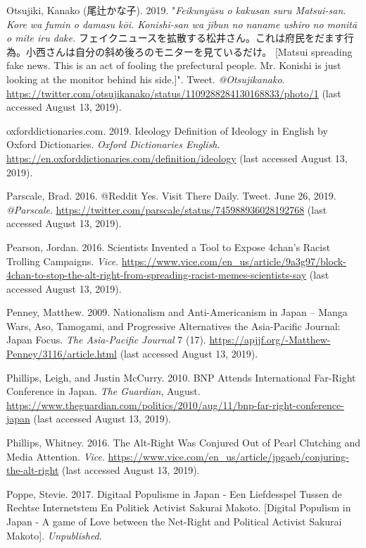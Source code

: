 \documentclass[10pt,british,A4paper,twoside]{memoir}
\begin{document}
\hypertarget{ref-otsujiki_eng._2019}{}
Otsujiki, Kanako (尾辻かな子). 2019. "\emph{Feikunyūsu o kakusan suru Matsui-san. Kore wa fumin o damasu kōi. Konishi-san wa jibun no naname ushiro no monitā o mite iru dake.} フェイクニュースを拡散する松井さん。これは府民をだます行為。小西さんは自分の斜め後ろのモニターを見ているだけ。 [Matsui spreading fake news. This is an act of fooling the prefectural people. Mr. Konishi is just looking at the monitor behind his side.]". Tweet. \emph{@Otsujikanako}.
\url{https://twitter.com/otsujikanako/status/1109288284130168833/photo/1} (last accessed August 13, 2019).

\hypertarget{ref-oxforddictionaries.com_ideology_2019}{}
oxforddictionaries.com. 2019. Ideology Definition of Ideology in English
by Oxford Dictionaries. \emph{Oxford Dictionaries English}.
\url{https://en.oxforddictionaries.com/definition/ideology} (last accessed August 13, 2019).

\hypertarget{ref-parscale_reddit_2016}{}
Parscale, Brad. 2016. @Reddit Yes. Visit There Daily. Tweet. June 26, 2019.
\emph{@Parscale}.
\url{https://twitter.com/parscale/status/745988936028192768} (last accessed August 13, 2019).

\hypertarget{ref-pearson_scientists_2016}{}
Pearson, Jordan. 2016. Scientists Invented a Tool to Expose 4chan's
Racist Trolling Campaigns. \emph{Vice}.
\url{https://www.vice.com/en_us/article/9a3g97/block-4chan-to-stop-the-alt-right-from-spreading-racist-memes-scientists-say} (last accessed August 13, 2019).

\hypertarget{ref-penney_nationalism_2009}{}
Penney, Matthew. 2009. Nationalism and Anti-Americanism in Japan --
Manga Wars, Aso, Tamogami, and Progressive Alternatives the Asia-Pacific
Journal: Japan Focus. \emph{The Asia-Pacific Journal} 7 (17).
\url{https://apjjf.org/-Matthew-Penney/3116/article.html} (last accessed August 13, 2019).

\hypertarget{ref-phillips_bnp_2010}{}
Phillips, Leigh, and Justin McCurry. 2010. BNP Attends International
Far-Right Conference in Japan. \emph{The Guardian}, August.
\url{https://www.theguardian.com/politics/2010/aug/11/bnp-far-right-conference-japan} (last accessed August 13, 2019).

\hypertarget{ref-phillips_alt-right_2016}{}
Phillips, Whitney. 2016. The Alt-Right Was Conjured Out of Pearl
Clutching and Media Attention. \emph{Vice}.
\url{https://www.vice.com/en_us/article/jpgaeb/conjuring-the-alt-right} (last accessed August 13, 2019).

\hypertarget{ref-poppe_digitaal_2017}{}
Poppe, Stevie. 2017. Digitaal Populisme in Japan - Een Liefdesspel Tussen de Rechtse Internetstem En Politiek Activist Sakurai Makoto. [Digital Populism in Japan - A game of Love between the Net-Right and Political Activist Sakurai Makoto].
\emph{Unpublished}.
\end{document}
